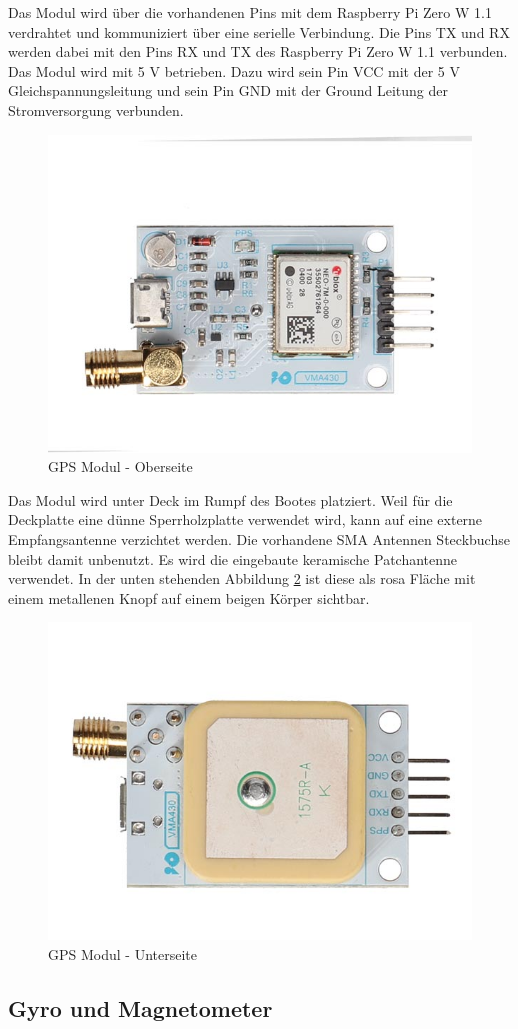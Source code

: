 Das Modul wird über die vorhandenen Pins mit dem Raspberry Pi Zero W 1.1 verdrahtet und  kommuniziert über eine serielle Verbindung. Die Pins TX und RX werden dabei mit den Pins RX und TX des Raspberry Pi Zero W 1.1 verbunden. Das Modul wird mit 5 V betrieben. Dazu wird sein Pin VCC mit der 5 V Gleichspannungsleitung und sein Pin GND mit der Ground Leitung der Stromversorgung verbunden.   
\begin{figure}[H]
    \centering
    \includegraphics[width=0.75\linewidth]{vma430_front-1.jpg}
    \caption{GPS Modul - Oberseite}
    \label{fig:enter-label}
\end{figure}
Das Modul wird unter Deck im Rumpf des Bootes platziert. Weil für die Deckplatte eine dünne Sperrholzplatte verwendet wird, kann auf eine externe Empfangsantenne verzichtet werden. Die vorhandene SMA Antennen Steckbuchse bleibt damit unbenutzt. Es wird die eingebaute keramische Patchantenne verwendet. In der unten stehenden Abbildung \ref{fig:GPS} ist diese als rosa Fläche mit einem metallenen Knopf auf einem beigen Körper sichtbar.
\begin{figure}[H]
    \centering
    \includegraphics[width=0.5\linewidth]{vma430_back-1.jpg}
    \caption{GPS Modul - Unterseite}
    \label{fig:GPS}
\end{figure}

\subsection{Gyro und Magnetometer}

